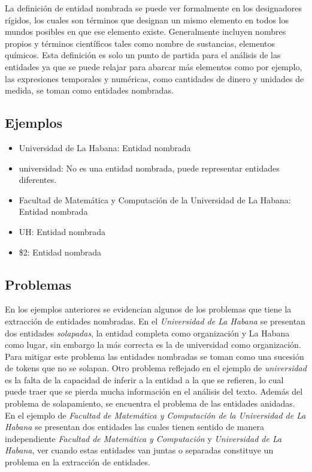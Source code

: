 \documentclass[runningheads]{llncs}
\begin{document}
La definición de entidad nombrada se puede ver formalmente en los designadores rígidos\cite{rigid_designator}, los cuales son términos que designan un mismo elemento en todos los mundos posibles en que ese elemento existe. Generalmente incluyen nombres propios y términos científicos tales como nombre de sustancias, elementos químicos. Esta definición es solo un punto de partida para el análisis de las entidades ya que se puede relajar  para abarcar más elementos como por ejemplo, las expresiones temporales y numéricas, como cantidades de dinero y unidades de medida, se toman como entidades nombradas. 

\subsection{Ejemplos}

\begin{itemize}

\item Universidad de La Habana: Entidad nombrada
\item universidad: No es una entidad nombrada, puede representar entidades diferentes.
\item Facultad de Matemática y Computación de la Universidad de La Habana: Entidad nombrada
\item UH: Entidad nombrada
\item \$2: Entidad nombrada
\end{itemize}

\subsection{Problemas}

En los ejemplos anteriores se evidencian algunos de los problemas que tiene la extracción de entidades nombradas. En el \emph{Universidad de La Habana} se presentan dos entidades \emph{solapadas}, la entidad completa como organización y La Habana como lugar, sin embargo la más correcta es la de universidad como organización. Para mitigar este problema las entidades nombradas se toman como una sucesión de tokens que no se solapan. Otro problema reflejado en el ejemplo de \emph{universidad} es la falta de la capacidad de inferir a la entidad a la que se refieren, lo cual puede traer que se pierda mucha información en el análisis del texto. Además del problema de solapamiento, se encuentra el problema de las entidades anidadas. En el ejemplo de \emph{Facultad de Matemática y Computación de la Universidad de La Habana} se presentan dos entidades las cuales tienen sentido de manera independiente \emph{Facultad de Matemática y Computación} y \emph{Universidad de La Habana}, ver cuando estas entidades van juntas o separadas constituye un problema en la extracción de entidades.
\end{document}
